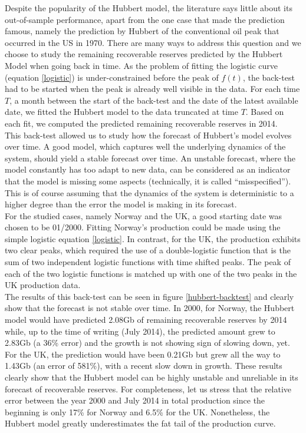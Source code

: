 \documentclass[review]{elsarticle}
\begin{document}
Despite the popularity of the Hubbert model, the literature says little about its out-of-sample performance,
apart from the one case that made the prediction famous, namely the prediction by Hubbert of the
 conventional oil peak that occurred in the US in 1970. There are many ways to address this question and we choose to study the remaining recoverable reserves predicted by the Hubbert Model when going back in time. As the problem of fitting the logistic curve (equation \ref{logistic}) is under-constrained before the peak of $f(t)$, the back-test had to be started when the peak is already well visible in the data. For each time $T$, a month between the start of the back-test and the date of the latest available date, we fitted the Hubbert model to the data truncated at time $T$. Based on each fit, we computed the predicted remaining recoverable reserves in 2014.\\
This back-test allowed us to study how the forecast of Hubbert's model evolves over time. A good model, which captures well the underlying dynamics of the system, should yield a stable forecast over time. An unstable forecast, where the model constantly has too adapt to new data, can be considered as an indicator that the model is missing some aspects (technically, it is called ``misspecified''). This is of course assuming that the dynamics of the system is deterministic to a higher degree than the error the model is making in its forecast.\\
For the studied cases, namely Norway and the UK, a good starting date was chosen to be 01/2000. Fitting Norway's production could be made using the simple logistic equation \ref{logistic}. In contrast, for the UK, the production exhibits two clear peaks, which required the use of a double-logistic function that is the sum of two independent logistic functions with time shifted peaks. The peak of each of the two logistic functions is matched up with one of the two peaks in the UK production data.\\
The results of this back-test can be seen in figure \ref{hubbert-backtest} and clearly show that the forecast is not stable over time. In 2000, for Norway, the Hubbert model would have predicted 2.08Gb of remaining recoverable reserves by 2014 while, up to the time of writing (July 2014), the predicted amount grew to 2.83Gb (a 36\% error) and the growth is not showing sign of slowing down, yet. For the UK, the prediction would have been 0.21Gb but grew all the way to 1.43Gb (an error of 581\%), with a recent slow down in growth. These results clearly show that the Hubbert model can be highly unstable and unreliable in its forecast of recoverable reserves. For completeness, let us stress that the relative error between the year 2000 and July 2014 in total production since the beginning is only 17\% for Norway and 6.5\% for the UK. Nonetheless, the Hubbert model greatly underestimates the fat tail of the production curve.\\
\end{document}
